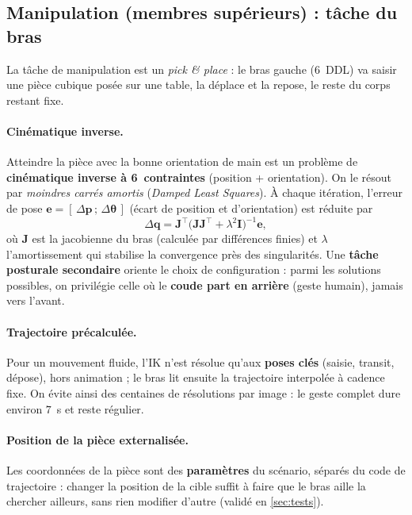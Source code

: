\documentclass[12pt]{article}
\begin{document}
\subsection{Manipulation (membres supérieurs) : tâche du bras}
\label{ssec:bras}

La tâche de manipulation est un \emph{pick \& place} : le bras gauche (6~DDL) va
saisir une pièce cubique posée sur une table, la déplace et la repose, le reste du
corps restant fixe.

\paragraph{Cinématique inverse.} Atteindre la pièce avec la bonne orientation de
main est un problème de \textbf{cinématique inverse à 6~contraintes}
(position + orientation). On le résout par \emph{moindres carrés amortis}
(\emph{Damped Least Squares}). À chaque itération, l'erreur de pose
$\bm{e} = [\,\Delta\bm{p}\,;\,\Delta\bm{\theta}\,]$ (écart de position et
d'orientation) est réduite par
\[
\Delta \bm{q} = \bm{J}^{\!\top}\bigl(\bm{J}\bm{J}^{\!\top} + \lambda^2 \bm{I}\bigr)^{-1}\bm{e},
\]
où $\bm{J}$ est la jacobienne du bras (calculée par différences finies) et
$\lambda$ l'amortissement qui stabilise la convergence près des singularités. Une
\textbf{tâche posturale secondaire} oriente le choix de configuration : parmi les
solutions possibles, on privilégie celle où le \textbf{coude part en arrière}
(geste humain), jamais vers l'avant.

\paragraph{Trajectoire précalculée.} Pour un mouvement fluide, l'IK n'est résolue
qu'aux \textbf{poses clés} (saisie, transit, dépose), hors animation ; le bras lit
ensuite la trajectoire interpolée à cadence fixe. On évite ainsi des centaines de
résolutions par image : le geste complet dure environ $7$~s et reste régulier.

\paragraph{Position de la pièce externalisée.} Les coordonnées de la pièce sont des
\textbf{paramètres} du scénario, séparés du code de trajectoire : changer la
position de la cible suffit à faire que le bras aille la chercher ailleurs, sans
rien modifier d'autre (validé en \cref{sec:tests}).
\end{document}

